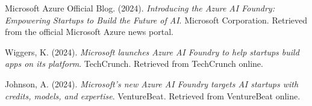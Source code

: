 \documentclass{article}
\begin{document}
\begin{thebibliography}{9}

Microsoft Azure Official Blog. (2024). \textit{Introducing the Azure AI Foundry: Empowering Startups to Build the Future of AI}. Microsoft Corporation. Retrieved from the official Microsoft Azure news portal.

Wiggers, K. (2024). \textit{Microsoft launches Azure AI Foundry to help startups build apps on its platform}. TechCrunch. Retrieved from TechCrunch online.

Johnson, A. (2024). \textit{Microsoft's new Azure AI Foundry targets AI startups with credits, models, and expertise}. VentureBeat. Retrieved from VentureBeat online.

\end{thebibliography}
\end{document}
